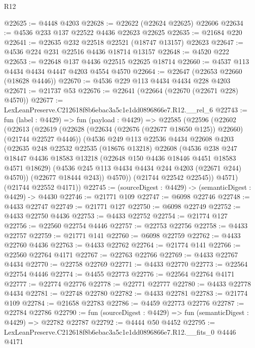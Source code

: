 \begin{lexlean}{R12}
\begin{coremodule}
@22625 := @4448 @4203
@22628 := @22622 (@22624 @22625) @22606
@22634 := @4536 @233 @137 @22522 @4436 @22623 @22625
@22635 := @21684 @220
@22641 := @22635 @232 @22518 @22521 (@18747 @13157) @22623
@22647 := @4536 @224 @231 @22516 @4436 @18714 @13157
@22648 := @4520 @222
@22653 := @22648 @137 @4436 @22515 @22625 @18714
@22660 := @4537 @113 @4434 @4434 @4447 @4203 @4554 @4570
@22664 := @22647 (@22653 @22660 (@18628 @4446))
@22670 := @4536 @229 @113 @4434 @4434 @228 @4203
@22671 := @21737 @53
@22676 := @22641 (@22664 (@22670 (@22671 @228) @4570))
@22677 := LexLeanPreserve.C212618f8b6ebac3a5c1e1dd0896866e7.R12.__rel_6
@22743 := fun (label : @4429) =>
  fun (payload : @4429) =>
  @22585
    (@22596
      (@22602
        (@22613
          (@22619
            (@22628 (@22634 (@22676 (@22677 @18650 @125)) @22660) (@21744 @22527 @4446))
            (@4536
              @249
              @113
              @22536
              @4434
              @22608
              @4203
              (@22635
                @248
                @22532
                @22535
                (@18676 @13218)
                @22608
                (@4536
                  @238
                  @247
                  @18447
                  @4436
                  @18583
                  @13218
                  (@22648 @150 @4436 @18446 @4451 @18583 @4571 @18629)
                  (@4536 @245 @113 @4434 @4434 @244 @4203 (@22671 @244) @4570))
                (@22677 @18444 @243))
              @4570))
          (@21744 @22542 @22545))
        @4571)
      (@21744 @22552 @4171))
@22745 := (sourceDigest : @4429) -> (semanticDigest : @4429) -> @4430
@22746 := @21771 @109
@22747 := @6098 @22746
@22748 := @4433 @22747
@22749 := @21771 @127
@22750 := @6098 @22749
@22752 := @4433 @22750 @4436
@22753 := @4433 @22752
@22754 := @21774 @127
@22756 := @22560 @22754 @4446
@22757 := @22753 @22756
@22758 := @4433 @22757
@22759 := @21771 @141
@22760 := @6098 @22759
@22762 := @4433 @22760 @4436
@22763 := @4433 @22762
@22764 := @21774 @141
@22766 := @22560 @22764 @4171
@22767 := @22763 @22766
@22769 := @4433 @22767 @4434
@22770 := @22758 @22769
@22771 := @4433 @22770
@22773 := @22564 @22754 @4446
@22774 := @4455 @22773
@22776 := @22564 @22764 @4171
@22777 := @22774 @22776
@22778 := @22771 @22777
@22780 := @4433 @22778 @4434
@22781 := @22748 @22780
@22782 := @4433 @22781
@22783 := @21774 @109
@22784 := @21658 @22783
@22786 := @4459 @22773 @22776
@22787 := @22784 @22786
@22790 := fun (sourceDigest : @4429) => fun (semanticDigest : @4429) => @22782 @22787
@22792 := @4444 @50 @4452
@22795 := LexLeanPreserve.C212618f8b6ebac3a5c1e1dd0896866e7.R12.__fits_0 @4446 @4171

\end{coremodule}
\end{lexlean}
